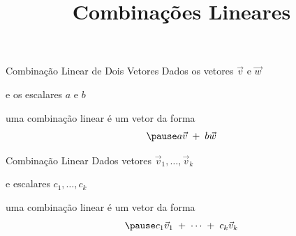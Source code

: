 \documentclass[fleqn,aspectratio=169,12pt]{beamer}
\title{Combinações Lineares}
\begin{document}
\addtitle

\begin{frame}{Combinação Linear de Dois Vetores}
  Dados os vetores
  \(
    \vec{v}
  \) e
  \(
    \vec{w}
  \)

  \pause
  e os escalares
  \(
    a
  \) e
  \(
    b
  \)

  \pause
  uma combinação linear é um vetor da forma
  \[
    \pause
    a \vec{v} \;+\; b \vec{w}
  \]
\end{frame}

\begin{frame}{Combinação Linear}
  Dados vetores
  \(
    \vec{v}_1, \ldots, \vec{v}_k
  \)

  \pause
  e escalares
  \(
    c_1, \ldots, c_k
  \)

  \pause
  uma combinação linear é um vetor da forma
  \[
    \pause
    c_1\vec{v}_1 \;+\; \cdots \;+\; c_k\vec{v}_k
  \]
\end{frame}




%
%

\end{document}
